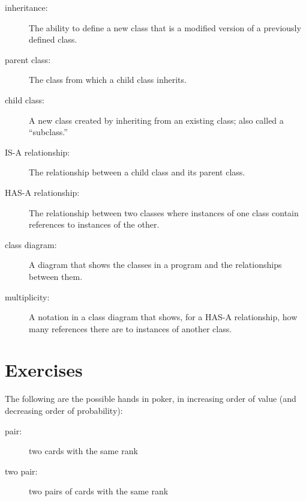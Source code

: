 \documentclass[10pt]{book}
\begin{document}
{\begin{description}
\item[inheritance:] The ability to define a new class that is a
modified version of a previously defined class.

\item[parent class:] The class from which a child class inherits.

\item[child class:] A new class created by inheriting from an
existing class; also called a ``subclass.''

\item[IS-A relationship:] The relationship between a child class
and its parent class.

\item[HAS-A relationship:] The relationship between two classes
where instances of one class contain references to instances of
the other.

\item[class diagram:] A diagram that shows the classes in a program
and the relationships between them.

\item[multiplicity:] A notation in a class diagram that shows, for
a HAS-A relationship, how many references there are to instances
of another class.

\end{description}


\section{Exercises}

\begin{ex}


The following are the possible hands in poker, in increasing order
of value (and decreasing order of probability):

\begin{description}

\item[pair:] two cards with the same rank
\vspace{-0.05in}

\item[two pair:] two pairs of cards with the same rank
\vspace{-0.05in}


\end{description}
\end{ex}}
\end{document}
